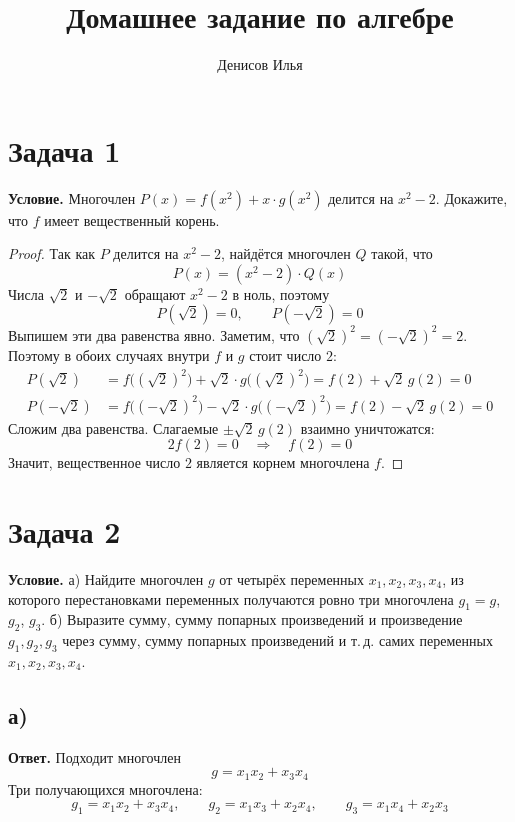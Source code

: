 \documentclass[12pt]{article}
\title{Домашнее задание по алгебре}
\author{Денисов Илья}
\date{}
\begin{document}
	\maketitle

	\section*{Задача 1}

	\noindent
	\textbf{Условие.} Многочлен $P(x) = f(x^2) + x \cdot g(x^2)$ делится на $x^2 - 2$. Докажите, что $f$ имеет вещественный корень.

	\begin{proof}
		Так как $P$ делится на $x^2 - 2$, найдётся многочлен $Q$ такой, что
		\[
			P(x) = (x^2 - 2) \cdot Q(x)
		\]
		Числа $\sqrt{2}$ и $-\sqrt{2}$ обращают $x^2 - 2$ в ноль, поэтому
		\[
			P(\sqrt{2}) = 0, \qquad P(-\sqrt{2}) = 0
		\]
		Выпишем эти два равенства явно. Заметим, что $(\sqrt{2})^2 = (-\sqrt{2})^2 = 2$. Поэтому в обоих случаях внутри $f$ и $g$ стоит число $2$:
		\begin{align*}
			P(\sqrt{2}) &= f\bigl((\sqrt{2})^2\bigr) + \sqrt{2} \cdot g\bigl((\sqrt{2})^2\bigr) = f(2) + \sqrt{2}\, g(2) = 0 \\
			P(-\sqrt{2}) &= f\bigl((-\sqrt{2})^2\bigr) - \sqrt{2} \cdot g\bigl((-\sqrt{2})^2\bigr) = f(2) - \sqrt{2}\, g(2) = 0
		\end{align*}
		Сложим два равенства. Слагаемые $\pm\sqrt{2}\, g(2)$ взаимно уничтожатся:
		\[
			2 f(2) = 0 \quad \Longrightarrow \quad f(2) = 0
		\]
		Значит, вещественное число $2$ является корнем многочлена $f$.
	\end{proof}

	\section*{Задача 2}

	\noindent
	\textbf{Условие.} а) Найдите многочлен $g$ от четырёх переменных $x_1, x_2, x_3, x_4$, из которого перестановками переменных получаются ровно три многочлена $g_1 = g$, $g_2$, $g_3$. б) Выразите сумму, сумму попарных произведений и произведение $g_1, g_2, g_3$ через сумму, сумму попарных произведений и т.\,д. самих переменных $x_1, x_2, x_3, x_4$.

	\subsection*{а)}

	\noindent
	\textbf{Ответ.} Подходит многочлен
	\[
		g = x_1x_2 + x_3x_4
	\]
	Три получающихся многочлена:
	\[
		g_1 = x_1x_2 + x_3x_4, \qquad g_2 = x_1x_3 + x_2x_4, \qquad g_3 = x_1x_4 + x_2x_3
	\]
\end{document}
